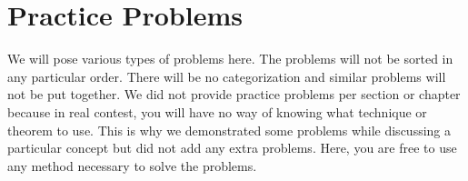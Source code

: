 \documentclass[inequalities.tex]{subfile}
\begin{document}
	\chapter{Practice Problems}\label{ch:practice}
	
	We will pose various types of problems here. The problems will not be sorted in any particular order. There will be no categorization and similar problems will not be put together. We did not provide practice problems per section or chapter because in real contest, you will have no way of knowing what technique or theorem to use. This is why we demonstrated some problems while discussing a particular concept but did not add any extra problems. Here, you are free to use any method necessary to solve the problems.
\end{document}
